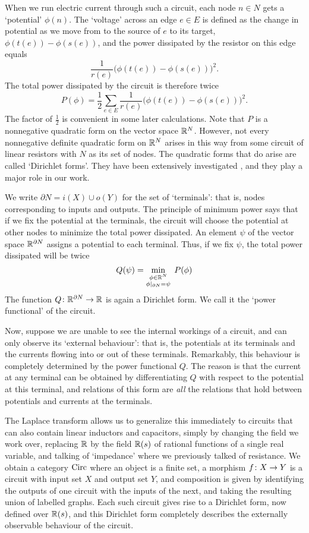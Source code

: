 When we run electric current through such a circuit, each node $n \in N$ gets
a `potential' $\phi(n)$.  The `voltage' across an edge $e \in E$ is defined as the 
change in potential as we move from to the source of $e$ to its target, $\phi(t(e)) - 
\phi(s(e))$, and the power dissipated by the resistor on this edge equals
\[      
\frac{1}{r(e)}\big(\phi(t(e))-\phi(s(e))\big)^2. 
\]
The total power dissipated by the circuit is therefore twice
\[   
P(\phi) = \frac{1}{2}\sum_{e \in E} \frac{1}{r(e)}\big(\phi(t(e))-\phi(s(e))\big)^2.
\]
The factor of $\frac{1}{2}$ is convenient in some later calculations.  
Note that $P$ is a nonnegative quadratic form on the vector space ${\mathbb{R}}^N$.
However, not every nonnegative definite quadratic form on ${\mathbb{R}}^N$ arises in this way from some circuit of linear resistors with $N$ as its set of nodes.  The quadratic forms that do arise are called `Dirichlet forms'.  They have been extensively investigated \cite{Fukushima,MR,Sabot1997,Sabot2004}, and they play a major role in our work.

We write $\partial N = i(X) \cup o(Y)$ for the set of `terminals': that is,
nodes corresponding to inputs and outputs.    The principle of minimum
power says that if we fix the potential at the terminals, the circuit will choose
the potential at other nodes to minimize the total power dissipated.   
An element $\psi$ of the vector space ${\mathbb{R}}^{\partial N}$ assigns a potential 
to each terminal.   Thus, if we fix $\psi$, the total power dissipated will be twice
\[
  Q(\psi) = \min_{\substack{ \phi \in {\mathbb{R}}^N \\ \phi\vert_{\partial N} = \psi}} \; P(\phi)  
\]
The function $Q {\colon} {\mathbb{R}}^{\partial N} \to {\mathbb{R}}$ is again a Dirichlet form.  We call it the `power functional' of the circuit.  

Now, suppose we are unable to see the internal workings of a circuit, and can only observe its `external behaviour': that is, the potentials at its terminals and the currents flowing into or out of these terminals.   Remarkably, this behaviour is completely determined by the power functional $Q$.  The reason is that the current at any terminal can be obtained by differentiating $Q$ with respect to the potential at this terminal, and relations of this form are \emph{all} the relations that hold between potentials and currents at the terminals.

The Laplace transform allows us to generalize this immediately to circuits that
can also contain linear inductors and capacitors, simply by changing the field we work over, replacing ${\mathbb{R}}$ by the field ${\mathbb{R}}(s)$ of rational functions of a single real variable,
and talking of `impedance' where we previously talked of resistance.  We obtain
a category $\mathrm{Circ}$ where an object is a finite set, a morphism $f {\colon} X \to Y$ is a circuit with input set $X$ and output set $Y$, and composition is given by identifying the outputs of one circuit with the inputs of the next, and taking the resulting union of labelled graphs.  Each such circuit gives rise to a Dirichlet form, now defined over
${\mathbb{R}}(s)$, and this Dirichlet form completely describes the externally observable
behaviour of the circuit.  

